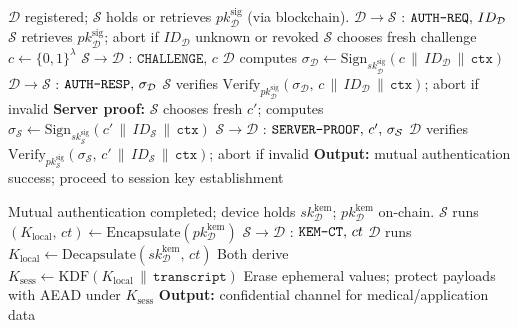 \documentclass{article}
\begin{document}
\begin{algorithm}[!t]
\caption{Authentication Phase (Mutual)}
\label{alg:authentication}
\begin{algorithmic}[1]
\Require $\mathcal{D}$ registered; $\mathcal{S}$ holds or retrieves $pk_{\mathcal{D}}^{\mathrm{sig}}$ (via blockchain).
\State $\mathcal{D} \rightarrow \mathcal{S}$ : $\texttt{AUTH\text{-}REQ},\, ID_{\mathcal{D}}$
\State $\mathcal{S}$ retrieves $pk_{\mathcal{D}}^{\mathrm{sig}}$; abort if $ID_{\mathcal{D}}$ unknown or revoked
\State $\mathcal{S}$ chooses fresh challenge $c \gets \{0,1\}^{\lambda}$
\State $\mathcal{S} \rightarrow \mathcal{D}$ : $\texttt{CHALLENGE},\, c$
\State $\mathcal{D}$ computes $\sigma_{\mathcal{D}} \gets \mathrm{Sign}_{sk_{\mathcal{D}}^{\mathrm{sig}}}(c \,\|\, ID_{\mathcal{D}} \,\|\, \texttt{ctx})$
\State $\mathcal{D} \rightarrow \mathcal{S}$ : $\texttt{AUTH\text{-}RESP},\, \sigma_{\mathcal{D}}$
\State $\mathcal{S}$ verifies $\mathrm{Verify}_{pk_{\mathcal{D}}^{\mathrm{sig}}}(\sigma_{\mathcal{D}},\, c \,\|\, ID_{\mathcal{D}} \,\|\, \texttt{ctx})$; abort if invalid
\State \textbf{Server proof:} $\mathcal{S}$ chooses fresh $c'$; computes $\sigma_{\mathcal{S}} \gets \mathrm{Sign}_{sk_{\mathcal{S}}^{\mathrm{sig}}}(c' \,\|\, ID_{\mathcal{S}} \,\|\, \texttt{ctx})$
\State $\mathcal{S} \rightarrow \mathcal{D}$ : $\texttt{SERVER\text{-}PROOF},\, c',\, \sigma_{\mathcal{S}}$
\State $\mathcal{D}$ verifies $\mathrm{Verify}_{pk_{\mathcal{S}}^{\mathrm{sig}}}(\sigma_{\mathcal{S}},\, c' \,\|\, ID_{\mathcal{S}} \,\|\, \texttt{ctx})$; abort if invalid
\State \textbf{Output:} mutual authentication success; proceed to session key establishment
\end{algorithmic}
\end{algorithm}

\begin{algorithm}[!t]
\caption{Session Key Establishment (ML-KEM)}
\label{alg:sessionkey}
\begin{algorithmic}[1]
\Require Mutual authentication completed; device holds $sk_{\mathcal{D}}^{\mathrm{kem}}$; $pk_{\mathcal{D}}^{\mathrm{kem}}$ on-chain.
\State $\mathcal{S}$ runs $(K_{\mathrm{local}},\, ct) \gets \mathrm{Encapsulate}(pk_{\mathcal{D}}^{\mathrm{kem}})$ 
\State $\mathcal{S} \rightarrow \mathcal{D}$ : $\texttt{KEM\text{-}CT},\, ct$
\State $\mathcal{D}$ runs $K_{\mathrm{local}} \gets \mathrm{Decapsulate}(sk_{\mathcal{D}}^{\mathrm{kem}},\, ct)$
\State Both derive $K_{\mathrm{sess}} \gets \mathrm{KDF}(K_{\mathrm{local}} \,\|\, \texttt{transcript})$ 
\State Erase ephemeral values; protect payloads with AEAD under $K_{\mathrm{sess}}$
\State \textbf{Output:} confidential channel for medical/application data
\end{algorithmic}
\end{algorithm}
\end{document}

